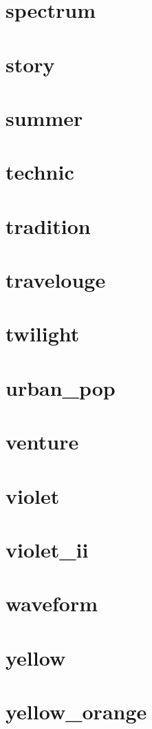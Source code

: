 \section{spectrum}
\newpage
\section{story}
\newpage
\section{summer}
\newpage
\section{technic}
\newpage
\section{tradition}
\newpage
\section{travelouge}
\newpage
\section{twilight}
\newpage
\section{urban\_pop}
\newpage
\section{venture}
\newpage
\section{violet}
\newpage
\section{violet\_ii}
\newpage
\section{waveform}
\newpage
\section{yellow}
\newpage
\section{yellow\_orange}
\newpage
